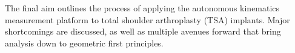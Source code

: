 The final aim outlines the process of applying the autonomous kinematics measurement platform to total shoulder arthroplasty (TSA) implants.
Major shortcomings are discussed, as well as multiple avenues forward that bring analysis down to geometric first principles.
